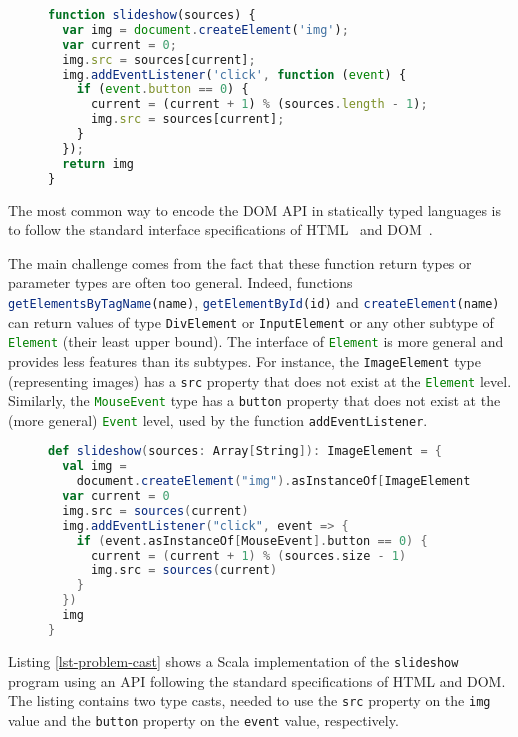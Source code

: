 \documentclass{llncs}
\newcommand{\jscode}[1]{\lstinline[language=JavaScript]|#1|}
\newcommand{\scalacode}[1]{\lstinline[language=Scala]|#1|}
\begin{document}
\begin{figure}
\begin{lstlisting}[label=lst-problem,language=JavaScript,caption=JavaScript function creating a slide show from an array of image URLs]
function slideshow(sources) {
  var img = document.createElement('img');
  var current = 0;
  img.src = sources[current];
  img.addEventListener('click', function (event) {
    if (event.button == 0) {
      current = (current + 1) % (sources.length - 1);
      img.src = sources[current];
    }
  });
  return img
}
\end{lstlisting}
\end{figure}

The most common way to encode the DOM API in statically typed languages is to follow the standard interface specifications of HTML~\cite{Raggett99_HTML} and DOM~\cite{w3c2004document}. 

The main challenge comes from the fact that these function return types or parameter types are often too general. Indeed, functions \jscode{getElementsByTagName(name)}, \jscode{getElementById(id)} and \jscode{createElement(name)} can return values of type \jscode{DivElement} or \jscode{InputElement} or any other subtype of \jscode{Element} (their least upper bound). The interface of \jscode{Element} is more general and provides less features than its subtypes. For instance, the \jscode{ImageElement} type (representing images) has a \jscode{src} property that does not exist at the \jscode{Element} level. Similarly, the \jscode{MouseEvent} type has a \jscode{button} property that does not exist at the (more general) \jscode{Event} level, used by the function \jscode{addEventListener}.

\begin{figure}
\begin{lstlisting}[label=lst-problem-cast,language=Scala,caption={Scala implementation of \texttt{slideshow} using the standard HTML and DOM API}]
def slideshow(sources: Array[String]): ImageElement = {
  val img =
    document.createElement("img").asInstanceOf[ImageElement]
  var current = 0
  img.src = sources(current)
  img.addEventListener("click", event => {
    if (event.asInstanceOf[MouseEvent].button == 0) {
      current = (current + 1) % (sources.size - 1)
      img.src = sources(current)
    }
  })
  img
}
\end{lstlisting}
\end{figure}

Listing \ref{lst-problem-cast} shows a Scala implementation of the \jscode{slideshow} program using an API following the standard specifications of HTML and DOM. The listing contains two type casts, needed to use the \scalacode{src} property on the \scalacode{img} value and the \scalacode{button} property on the \scalacode{event} value, respectively.
\end{document}
